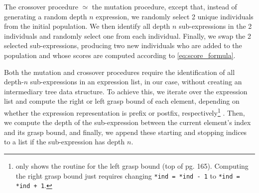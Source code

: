 \documentclass[runningheads]{llncs}
\begin{document}
\par The crossover procedure $\simeq$ the mutation procedure, except that, instead of generating a random depth $n$ expression, we randomly select 2 unique individuals from the initial population. We then identify all depth $n$ sub-expressions in the 2 individuals and randomly select one from each individual. Finally, we swap the 2 selected sub-expressions, producing two new individuals who are added to the population and whose scores are computed according to \ref{eq:score_formula}.

\par Both the mutation and crossover procedures require the identification of all depth-$n$ sub-expressions in an expression list, in our case, without creating an intermediary tree data structure. To achieve this, we iterate over the expression list and compute the right or left grasp bound of each element, depending on whether the expression representation is prefix or postfix, respectively\footnote{\cite{3ce09117-c08b-3ddb-b2ba-3ea8005b2118} only shows the routine for the left grasp bound (top of pg. 165). Computing the right grasp bound just requires changing \texttt{*ind = *ind - 1} to \texttt{*ind = *ind + 1}.} \cite{3ce09117-c08b-3ddb-b2ba-3ea8005b2118}. Then, we compute the depth of the sub-expression between the current element's index and its grasp bound, and finally, we append these starting and stopping indices to a list if the sub-expression has depth $n$.
\end{document}
